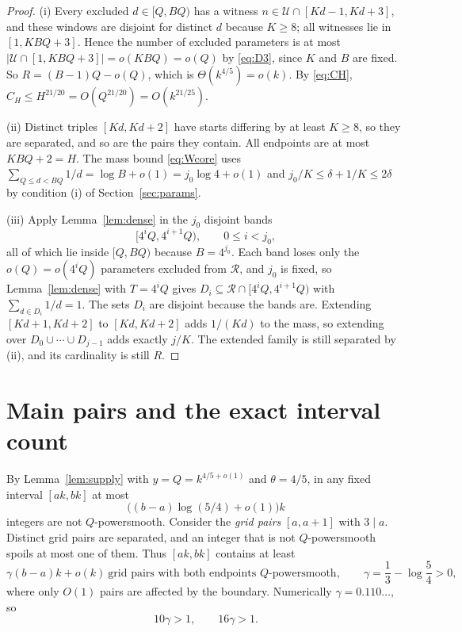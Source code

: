 \documentclass[11pt,letterpaper]{article}
\numberwithin{equation}{section}
\theoremstyle{plain}
\theoremstyle{remark}
\newcommand{\cU}{\mathcal U}
\newcommand{\cR}{\mathcal R}
\begin{document}
\begin{proof}
(i) Every excluded $d\in[Q,BQ)$ has a witness $n\in\cU\cap[Kd-1,Kd+3]$, and these windows are disjoint for distinct $d$ because $K\ge8$; all witnesses lie in $[1,KBQ+3]$. Hence the number of excluded parameters is at most $|\cU\cap[1,KBQ+3]|=o(KBQ)=o(Q)$ by \eqref{eq:D3}, since $K$ and $B$ are fixed. So $R=(B-1)Q-o(Q)$, which is $\Theta(k^{4/5})=o(k)$. By \eqref{eq:CH}, $C_H\le H^{21/20}=O(Q^{21/20})=O(k^{21/25})$.

(ii) Distinct triples $[Kd,Kd+2]$ have starts differing by at least $K\ge8$, so they are separated, and so are the pairs they contain. All endpoints are at most $KBQ+2=H$. The mass bound \eqref{eq:Wcore} uses $\sum_{Q\le d<BQ}1/d=\log B+o(1)=j_0\log4+o(1)$ and $j_0/K\le\delta+1/K\le2\delta$ by condition (i) of Section~\ref{sec:params}.

(iii) Apply Lemma~\ref{lem:dense} in the $j_0$ disjoint bands
\[
[4^iQ,4^{i+1}Q),\qquad 0\le i<j_0,
\]
all of which lie inside $[Q,BQ)$ because $B=4^{j_0}$. Each band loses only the $o(Q)=o(4^iQ)$ parameters excluded from $\cR$, and $j_0$ is fixed, so Lemma~\ref{lem:dense} with $T=4^iQ$ gives $D_i\subseteq\cR\cap[4^iQ,4^{i+1}Q)$ with $\sum_{d\in D_i}1/d=1$. The sets $D_i$ are disjoint because the bands are. Extending $[Kd+1,Kd+2]$ to $[Kd,Kd+2]$ adds $1/(Kd)$ to the mass, so extending over $D_0\cup\cdots\cup D_{j-1}$ adds exactly $j/K$. The extended family is still separated by (ii), and its cardinality is still $R$.
\end{proof}

\section{Main pairs and the exact interval count}\label{sec:main}

By Lemma~\ref{lem:supply} with $y=Q=k^{4/5+o(1)}$ and $\theta=4/5$, in any fixed interval $[ak,bk]$ at most
\[
\bigl((b-a)\log(5/4)+o(1)\bigr)k
\]
integers are not $Q$-powersmooth. Consider the \emph{grid pairs} $[a,a+1]$ with $3\mid a$. Distinct grid pairs are separated, and an integer that is not $Q$-powersmooth spoils at most one of them. Thus $[ak,bk]$ contains at least
\begin{equation}\label{eq:gamma}
\gamma(b-a)k+o(k)\ \text{grid pairs with both endpoints $Q$-powersmooth},\qquad
\gamma=\frac13-\log\frac54>0,
\end{equation}
where only $O(1)$ pairs are affected by the boundary. Numerically $\gamma=0.110\ldots$, so
\begin{equation}\label{eq:gammabounds}
10\gamma>1,\qquad16\gamma>1 .
\end{equation}
\end{document}
